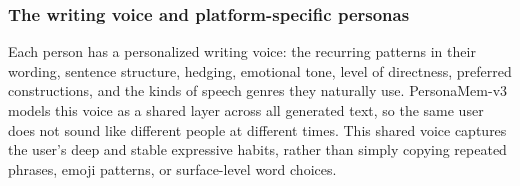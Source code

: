\documentclass[]{fairmeta}
\begin{document}
\subsubsection{The writing voice and platform-specific personas}
\label{subsubsec:shared_voice}

Each person has a personalized writing voice: the recurring patterns in their wording, sentence structure, hedging, emotional tone, level of directness, preferred constructions, and the kinds of speech genres they naturally use. PersonaMem-v3 models this voice as a shared layer across all generated text, so the same user does not sound like different people at different times. This shared voice captures the user’s deep and stable expressive habits, rather than simply copying repeated phrases, emoji patterns, or surface-level word choices.
\end{document}
